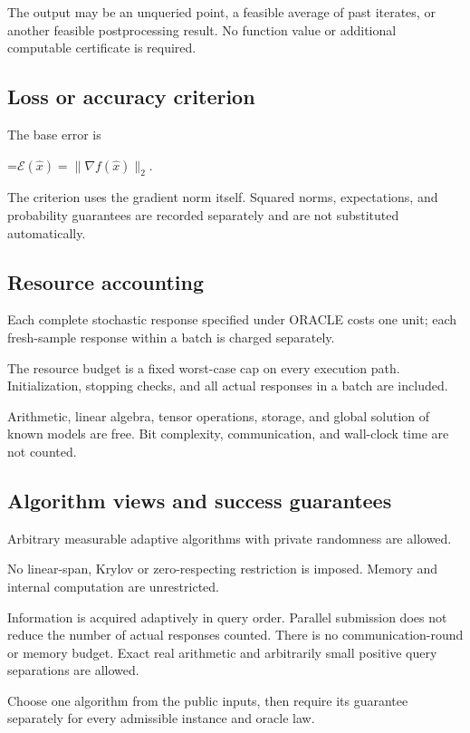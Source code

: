\documentclass[10pt,a4paper]{article}
\newcommand{\AtlasMath}[1]{\par\begingroup\centering\setbox0=\hbox{$\displaystyle #1$}\ifdim\wd0>1.4\linewidth\typeout{ATLAS WIDE FORMULA: \the\wd0}\fi\ifdim\wd0>\linewidth\resizebox{\linewidth}{!}{\box0}\else\box0\fi\par\endgroup}
\begin{document}
The output may be an unqueried point, a feasible average of past iterates, or another feasible postprocessing result. No function value or additional computable certificate is required.

\subsection{Loss or accuracy criterion}
The base error is


\AtlasMath{\mathcal{E}(\widehat{x})=\|\nabla f(\widehat{x})\|_2.}


The criterion uses the gradient norm itself. Squared norms, expectations, and probability guarantees are recorded separately and are not substituted automatically.

\subsection{Resource accounting}
Each complete stochastic response specified under ORACLE costs one unit; each fresh-sample response within a batch is charged separately.

The resource budget is a fixed worst-case cap on every execution path. Initialization, stopping checks, and all actual responses in a batch are included.

Arithmetic, linear algebra, tensor operations, storage, and global solution of known models are free. Bit complexity, communication, and wall-clock time are not counted.

\subsection{Algorithm views and success guarantees}
Arbitrary measurable adaptive algorithms with private randomness are allowed.

No linear-span, Krylov or zero-respecting restriction is imposed. Memory and internal computation are unrestricted.

Information is acquired adaptively in query order. Parallel submission does not reduce the number of actual responses counted. There is no communication-round or memory budget. Exact real arithmetic and arbitrarily small positive query separations are allowed.

Choose one algorithm from the public inputs, then require its guarantee separately for every admissible instance and oracle law.
\end{document}
